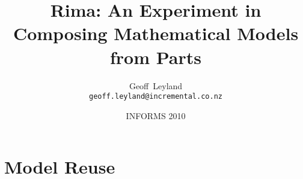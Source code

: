 \documentclass[smaller,handout]{beamer}
\title[Rima]{Rima: An Experiment in Composing Mathematical Models from Parts}
\author[Geoff~Leyland]{Geoff~Leyland \\ \texttt{geoff.leyland@incremental.co.nz}}
\institute[Incremental Limited] {Incremental Limited}
\date[INFORMS 2010]{INFORMS 2010}
\begin{document}

\begin{frame}
  \titlepage
\end{frame}



\section{Model Reuse}

\begin{comment}
\subsection{Model Reuse}
\begin{frame}{Model Reuse}

  {\bf Reuse:} Someone (maybe you) has done some good work writing a model,
  and someone (maybe you) would like to use the model in a different context
  \vspace{\stretch{1}}\pause

  Ideally:
  \begin{itemize}
    \item the model would be as flexible as possible
    \item the model would not need to be modified
    \item using the model would not require detailed knowledge of its internals, only an understanding of its interface
    \item it would be easy to share improvements to the model
  \end{itemize}
\end{frame}


\begin{frame}{One to Many}
  Suppose you have:
  \begin{itemize}
    \item a \emph{single}-period electricity dispatch model
    \item a model for a \emph{single} knapsack
  \end{itemize}
  \vspace{\stretch{1}}\pause
  and you would like to extend it to:
  \begin{itemize}
    \item a \emph{multi}-period electricity dispatch model
    \item a \emph{multiple} knapsack model (generalised assignment)
  \end{itemize}
  \vspace{\stretch{1}}\pause
  \bf{You will have modify the model to re-use it}
\end{frame}
\end{comment}
\end{document}
